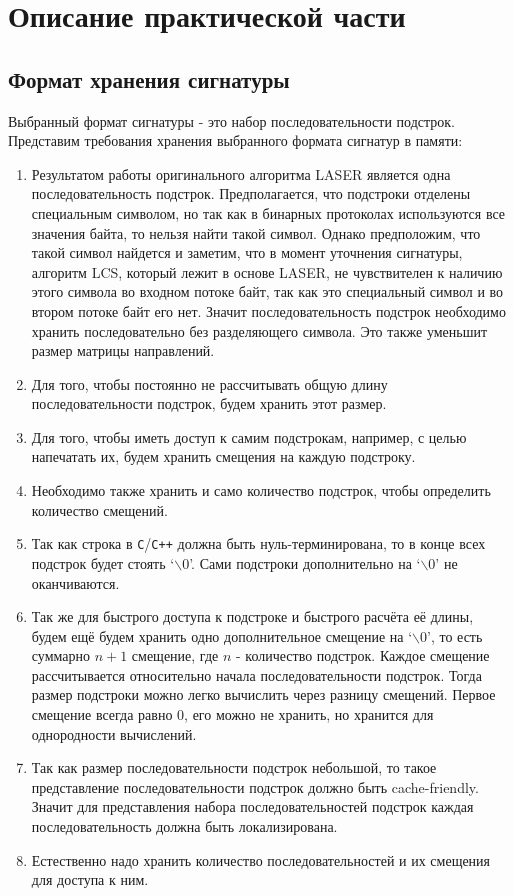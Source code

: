 \section{Описание практической части}
\label{sec:Section4} 

\subsection{Формат хранения сигнатуры}

Выбранный формат сигнатуры - это набор последовательности подстрок. Представим требования хранения выбранного формата сигнатур в памяти:

\begin{enumerate}
    \item Результатом работы оригинального алгоритма LASER является одна последовательность подстрок.
    Предполагается, что подстроки отделены специальным символом, но так как в бинарных протоколах используются все значения байта, то
    нельзя найти такой символ. Однако предположим, что такой символ найдется и заметим, что в момент уточнения сигнатуры, алгоритм LCS, который лежит в основе LASER,
    не чувствителен к наличию этого символа во входном потоке байт, так как это специальный символ и во втором потоке байт его нет.
    Значит последовательность подстрок необходимо хранить последовательно без разделяющего символа. Это также уменьшит размер матрицы направлений.
    \item Для того, чтобы постоянно не рассчитывать общую длину последовательности подстрок, будем хранить этот размер.
    \item Для того, чтобы иметь доступ к самим подстрокам, например, с целью напечатать их, будем хранить смещения на каждую подстроку.
    \item Необходимо также хранить и само количество подстрок, чтобы определить количество смещений.
    \item Так как строка в \verb!C!/\verb!C++! должна быть нуль-терминирована, то в конце всех подстрок будет стоять  `$\backslash 0$'.
    Сами подстроки дополнительно на `$\backslash 0$' не оканчиваются.
    \item Так же для быстрого доступа к подстроке и быстрого расчёта её длины, будем ещё будем хранить одно дополнительное смещение на `$\backslash 0$',
    то есть суммарно $n + 1$ смещение, где $n$ - количество подстрок. Каждое смещение рассчитывается относительно начала последовательности подстрок.
    Тогда размер подстроки можно легко вычислить через разницу смещений. Первое смещение всегда равно 0, его можно не хранить, но хранится для однородности вычислений.
    \item Так как размер последовательности подстрок небольшой, то такое представление последовательности подстрок должно быть cache-friendly.
    Значит для представления набора последовательностей подстрок каждая последовательность должна быть локализирована.
    \item Естественно надо хранить количество последовательностей и их смещения для доступа к ним.
\end{enumerate}


